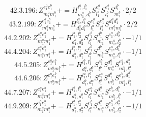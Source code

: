 \documentclass[letterpaper,10pt,fleqn,leqno,onecolumn]{article}
\begin{document}
\begin{equation} \;\;\;\;\;\;  42.3.196: Z^{e_{1}^{a}e_{1}^{b}}_{m_{1}^{a}m_{1}^{b}}+=H^{l_{1}^{a},l_{1}^{b}}_{m_{1}^{a},d_{1}^{b}}S^{e_{1}^{a}}_{l_{1}^{a}}S^{e_{1}^{b}}_{l_{1}^{b}}S^{d_{1}^{b}}_{m_{1}^{b}}\cdot 2/2 \end{equation}
\begin{equation} \;\;\;\;\;\;  43.2.199: Z^{e_{1}^{a}e_{1}^{b}}_{m_{1}^{a}m_{1}^{b}}+=H^{l_{1}^{a},l_{1}^{b}}_{d_{1}^{a}d_{1}^{b}}S^{e_{1}^{a}}_{l_{1}^{a}}S^{e_{1}^{b}}_{l_{1}^{b}}S^{d_{1}^{a}d_{1}^{b}}_{m_{1}^{a}m_{1}^{b}}\cdot 2/2 \end{equation}
\begin{equation} \;\;\;\;\;\;  44.2.202: Z^{e_{1}^{a}e_{1}^{b}}_{m_{1}^{a}m_{1}^{b}}+=H^{l_{1}^{b},l_{2}^{b}}_{d_{1}^{b},d_{2}^{b}}S^{e_{1}^{b}}_{l_{1}^{b}}S^{d_{1}^{b}}_{m_{1}^{b}}S^{e_{1}^{a},d_{2}^{b}}_{m_{1}^{a},l_{2}^{b}}\cdot -1/1 \end{equation}
\begin{equation} \;\;\;\;\;\;  44.4.204: Z^{e_{1}^{a}e_{1}^{b}}_{m_{1}^{a}m_{1}^{b}}+=H^{l_{1}^{b},l_{1}^{a}}_{d_{1}^{b},d_{1}^{a}}S^{e_{1}^{b}}_{l_{1}^{b}}S^{d_{1}^{b}}_{m_{1}^{b}}S^{e_{1}^{a},d_{1}^{a}}_{m_{1}^{a},l_{1}^{a}}\cdot -1/1 \end{equation}
\begin{equation} \;\;\;\;\;\;  44.5.205: Z^{e_{1}^{a}e_{1}^{b}}_{m_{1}^{a}m_{1}^{b}}+=H^{l_{1}^{b},l_{1}^{a}}_{d_{1}^{a},d_{1}^{b}}S^{e_{1}^{b}}_{l_{1}^{b}}S^{d_{1}^{a}}_{m_{1}^{a}}S^{e_{1}^{a},d_{1}^{b}}_{m_{1}^{b},l_{1}^{a}} \end{equation}
\begin{equation} \;\;\;\;\;\;  44.6.206: Z^{e_{1}^{a}e_{1}^{b}}_{m_{1}^{a}m_{1}^{b}}+=H^{l_{1}^{a},l_{1}^{b}}_{d_{1}^{b},d_{1}^{a}}S^{e_{1}^{a}}_{l_{1}^{a}}S^{d_{1}^{b}}_{m_{1}^{b}}S^{e_{1}^{b},d_{1}^{a}}_{m_{1}^{a},l_{1}^{b}} \end{equation}
\begin{equation} \;\;\;\;\;\;  44.7.207: Z^{e_{1}^{a}e_{1}^{b}}_{m_{1}^{a}m_{1}^{b}}+=H^{l_{1}^{a},l_{1}^{b}}_{d_{1}^{a},d_{1}^{b}}S^{e_{1}^{a}}_{l_{1}^{a}}S^{d_{1}^{a}}_{m_{1}^{a}}S^{e_{1}^{b},d_{1}^{b}}_{m_{1}^{b},l_{1}^{b}}\cdot -1/1 \end{equation}
\begin{equation} \;\;\;\;\;\;  44.9.209: Z^{e_{1}^{a}e_{1}^{b}}_{m_{1}^{a}m_{1}^{b}}+=H^{l_{1}^{a},l_{2}^{a}}_{d_{1}^{a},d_{2}^{a}}S^{e_{1}^{a}}_{l_{1}^{a}}S^{d_{1}^{a}}_{m_{1}^{a}}S^{e_{1}^{b},d_{2}^{a}}_{m_{1}^{b},l_{2}^{a}}\cdot -1/1 \end{equation}
\end{document}
